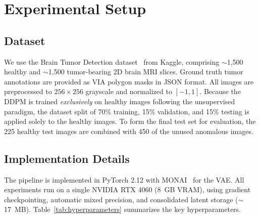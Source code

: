 \documentclass[graybox]{svmult}
\begin{document}
\section{Experimental Setup}
\label{sec:experiments}

\subsection{Dataset}
\label{sec:dataset}

We use the Brain Tumor Detection dataset~\cite{bhuvaji2020brain} from Kaggle, comprising $\sim$1,500 healthy and $\sim$1,500 tumor-bearing 2D brain MRI slices. Ground truth tumor annotations are provided as VIA polygon masks in JSON format. All images are preprocessed to $256 \times 256$ grayscale and normalized to $[-1, 1]$. Because the DDPM is trained \textit{exclusively} on healthy images following the unsupervised paradigm, the dataset split of 70\% training, 15\% validation, and 15\% testing is applied solely to the healthy images. To form the final test set for evaluation, the 225 healthy test images are combined with 450 of the unused anomalous images.

\subsection{Implementation Details}
\label{sec:implementation}

The pipeline is implemented in PyTorch 2.12 with MONAI~\cite{monai2022} for the VAE. All experiments run on a single NVIDIA RTX 4060 (8~GB VRAM), using gradient checkpointing, automatic mixed precision, and consolidated latent storage ($\sim$17~MB). Table~\ref{tab:hyperparameters} summarizes the key hyperparameters.
\end{document}
